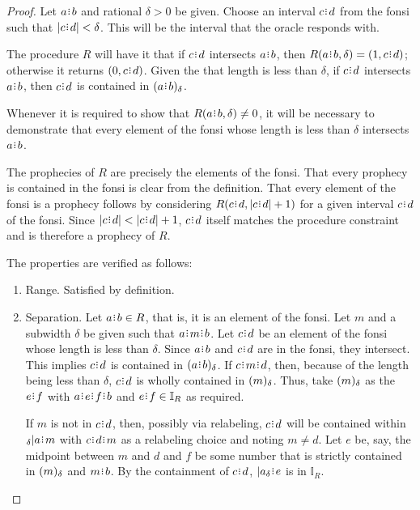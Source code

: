 \documentclass[12pt]{article}
\begin{document}
\begin{proof}
    Let $a\rint b$ and rational $\delta>0$ be given. Choose an interval $c\rint d$ from the fonsi such that $|c\rint d| < \delta$. This will be the interval that the oracle responds with. 

    The procedure $R$ will have it that if $c\rint d$ intersects $a\rint b$, then $R(a\rint b, \delta) = (1, c\rint d)$; otherwise it returns $(0, c \rint d)$.  Given the that length is less than $\delta$, if $c\rint d$ intersects $a\rint b$, then  $c\rint d$ is contained in $\halo{a\rint b}$.

    Whenever it is required to show that $R(a\rint b, \delta) \neq 0$, it will be necessary to demonstrate that every element of the fonsi whose length is less than $\delta$ intersects $a\rint b$. 
    
    The prophecies of $R$ are precisely the elements of the fonsi. That every prophecy is contained in the fonsi is clear from the definition. That every element of the fonsi is a prophecy follows by considering $R(c\rint d, |c\rint d|+1)$ for a given interval $c\rint d$ of the fonsi. Since $|c\rint d| < |c\rint d|+1$, $c\rint d$ itself matches the procedure constraint and is therefore a prophecy of $R$. 

    The properties are verified as follows:  
    \begin{enumerate}
        \item Range. Satisfied by definition. 
        \item Separation. 
        Let $a\rint b \in R$, that is, it is an element of the fonsi. Let $m$ and a subwidth $\delta$ be given such that $a\rint m\rint b$. Let $c\rint d$ be an element of the fonsi whose length is less than $\delta$. Since $a\rint b$ and $c\rint d$ are in the fonsi, they intersect. This implies $c\rint d$ is contained in $\halo{a\rint b}$. If $c\rint m\rint d$, then, because of the length being less than $\delta$, $c\rint d$ is wholly contained in $(m)_{\delta}$. Thus, take $(m)_{\delta}$ as the $e\rint f$ with $a\rint e\rint f\rint b$ and $e\rint f \in \mathbb{I}_{R}$ as required. 
        
        If $m$ is not in $c\rint d$, then, possibly via relabeling, $c\rint d$ will be contained within ${}_\delta |a\rint m$ with $c\rint d\rint m$ as a relabeling choice and noting $m \neq d$. Let $e$ be, say, the midpoint between $m$ and $d$ and $f$ be some number that is strictly contained in $(m)_{\delta}$ and $m\rint b$. By the containment of $c\rint d$, $|a_\delta\rint e$ is in $\mathbb{I}_R$.
        

\end{enumerate}
\end{proof}
\end{document}
